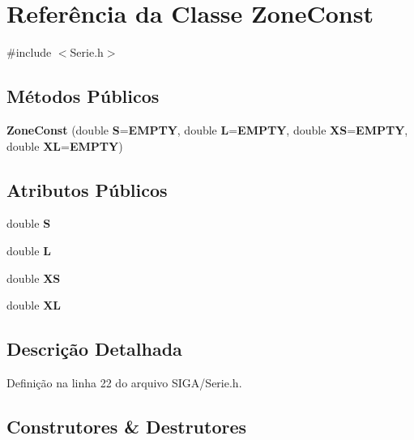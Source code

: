 \section{Referência da Classe Zone\+Const}
\label{class_zone_const}


{\ttfamily \#include $<$Serie.\+h$>$}

\subsection*{Métodos Públicos}
\begin{DoxyCompactItemize}
\item 
{\bf Zone\+Const} (double {\bf S}={\bf E\+M\+P\+TY}, double {\bf L}={\bf E\+M\+P\+TY}, double {\bf XS}={\bf E\+M\+P\+TY}, double {\bf XL}={\bf E\+M\+P\+TY})
\end{DoxyCompactItemize}
\subsection*{Atributos Públicos}
\begin{DoxyCompactItemize}
\item 
double {\bf S}
\item 
double {\bf L}
\item 
double {\bf XS}
\item 
double {\bf XL}
\end{DoxyCompactItemize}


\subsection{Descrição Detalhada}


Definição na linha 22 do arquivo S\+I\+G\+A/\+Serie.\+h.



\subsection{Construtores \& Destrutores}

